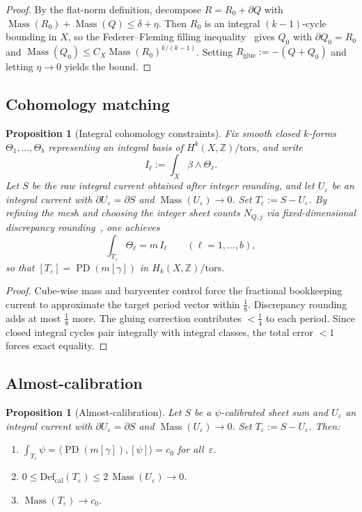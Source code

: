 \documentclass[11pt]{article}
\numberwithin{equation}{section}
\theoremstyle{plain}
\newtheorem{proposition}[theorem]{Proposition}
\theoremstyle{definition}
\theoremstyle{remark}
\DeclareMathOperator{\Mass}{Mass}
\DeclareMathOperator{\PD}{PD}
\newcommand{\Z}{\mathbb{Z}}
\newcommand{\eps}{\varepsilon}
\newcommand{\Def}{\mathrm{Def}}
\newcommand{\Defcal}{\Def_{\mathrm{cal}}}
\begin{document}
\begin{proof}
By the flat-norm definition, decompose $R=R_0+\partial Q$ with
$\Mass(R_0)+\Mass(Q)\le\delta+\eta$.
Then $R_0$ is an integral $(k{-}1)$-cycle bounding in $X$, so the
Federer--Fleming filling inequality~\cite{FF60,Fed69} gives $Q_0$ with
$\partial Q_0=R_0$ and $\Mass(Q_0)\le C_X\Mass(R_0)^{k/(k-1)}$.
Setting $R_{\mathrm{glue}}:=-(Q+Q_0)$ and letting $\eta\to 0$ yields
the bound.
\end{proof}


\subsection*{Cohomology matching}

\begin{proposition}[Integral cohomology constraints]\label{prop:cohomology-match}
Fix smooth closed $k$-forms $\Theta_1,\dots,\Theta_b$ representing an integral
basis of $H^k(X,\Z)/\mathrm{tors}$, and write
\[
I_\ell:=\int_X \beta\wedge\Theta_\ell.
\]
Let $S$ be the raw integral current obtained after integer rounding, and let
$U_\eps$ be an integral current with $\partial U_\eps=\partial S$ and
$\Mass(U_\eps)\to 0$. Set $T_\eps:=S-U_\eps$.
By refining the mesh and choosing the integer sheet counts $N_{Q,j}$ via
fixed-dimensional discrepancy rounding~\cite{BaranyGrinberg81}, one achieves
\[
\int_{T_\eps}\Theta_\ell = m\,I_\ell
\qquad (\ell=1,\dots,b),
\]
so that $[T_\eps]=\PD(m[\gamma])$ in $H_k(X,\Z)/\mathrm{tors}$.
\end{proposition}

\begin{proof}
Cube-wise mass and barycenter control force the fractional bookkeeping
current to approximate the target period vector within $\frac18$.
Discrepancy rounding adds at most $\frac18$ more.
The gluing correction contributes $<\frac14$ to each period.
Since closed integral cycles pair integrally with integral classes, the
total error $<1$ forces exact equality.
\end{proof}


\subsection*{Almost-calibration}

\begin{proposition}[Almost-calibration]\label{prop:almost-calibration}
Let $S$ be a $\psi$-calibrated sheet sum and $U_\eps$ an integral current
with $\partial U_\eps=\partial S$ and $\Mass(U_\eps)\to 0$.  Set
$T_\eps:=S-U_\eps$.  Then:
\begin{enumerate}
\item[\textnormal{(i)}] $\displaystyle\int_{T_\eps}\psi
  =\langle\PD(m[\gamma]),[\psi]\rangle=c_0$ for all~$\eps$.
\item[\textnormal{(ii)}] $0\le\Defcal(T_\eps)\le 2\,\Mass(U_\eps)\to 0$.
\item[\textnormal{(iii)}] $\Mass(T_\eps)\to c_0$.
\end{enumerate}
\end{proposition}
\end{document}
